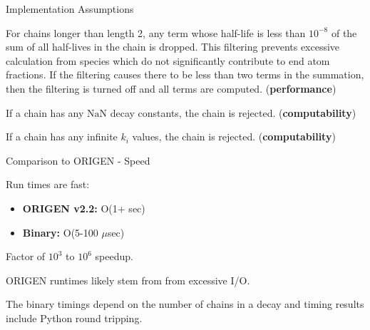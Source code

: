 \documentclass[xcolor=x11names,compress]{beamer}
\begin{document}

\begin{frame}{Implementation Assumptions}

    \vspace*{1em}
    For chains longer than length 2, any 
    term whose half-life is less than $10^{-8}$ of the sum of all 
    half-lives in the chain is dropped. This filtering prevents excessive
    calculation from species which do not significantly contribute to 
    end atom fractions. If the filtering causes there to be less than 
    two terms in the summation, then the filtering is turned off and all
    terms are computed. (\textbf{performance})

    \vspace*{1em}
    If a chain has any $\mathrm{NaN}$ decay constants, the chain is rejected.
    (\textbf{computability})

    \vspace*{1em}
    If a chain has any infinite $k_i$ values, the chain is rejected.
    (\textbf{computability})

\end{frame}



\begin{frame}{Comparison to ORIGEN - Speed}

    Run times are fast:
    \vspace*{1em}
    \begin{itemize}
        \item \textbf{ORIGEN v2.2:} O(1+ sec)
        \item \textbf{Binary:} O(5-100 $\mu$sec)
    \end{itemize}

    \vspace*{1em}
    Factor of $10^3$ to $10^6$ speedup.

    \vspace*{1em}
    ORIGEN runtimes likely stem from from excessive I/O. 

    \vspace*{1em}
    The binary timings depend on the number of chains in a decay and 
    timing results include Python round tripping.

\end{frame}

\end{document}
